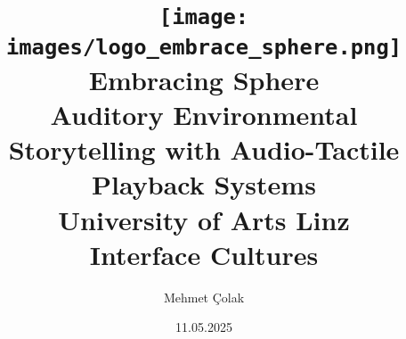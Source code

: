 \begin{titlepage}
  
    \author{Mehmet Çolak}
    \title{\texttt{[image: images/logo\_embrace\_sphere.png]}\\[5ex]  Embracing Sphere\\[1ex] 
    \Large Auditory Environmental Storytelling with Audio-Tactile Playback Systems\\[4ex]
    \large University of Arts Linz\\[0.5ex]
    Interface Cultures\\[6ex]}
    \date{11.05.2025}

\end{titlepage}

\maketitle